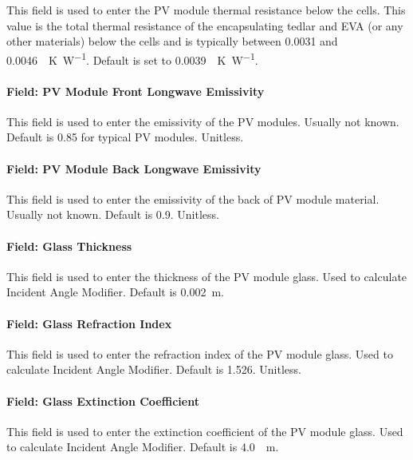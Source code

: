 This field is used to enter the PV module thermal resistance below the cells. This value is the total thermal resistance of the encapsulating tedlar and EVA (or any other materials) below the cells and is typically between 0.0031 and \SI{0.0046}{\area\K\per\watt}. Default is set to \SI{0.0039}{\area\K\per\watt}.

\paragraph{Field: PV Module Front Longwave Emissivity}\label{BIPVT-field-PVmodule-emissivity}

This field is used to enter the emissivity of the PV modules. Usually not known. Default is 0.85 for typical PV modules. Unitless.

\paragraph{Field: PV Module Back Longwave Emissivity}\label{BIPVT-field-moduleBack-emissivity}

This field is used to enter the emissivity of the back of PV module material. Usually not known. Default is 0.9. Unitless.

\paragraph{Field: Glass Thickness}\label{BIPVT-field-PVglass-thickness}

This field is used to enter the thickness of the PV module glass. Used to calculate Incident Angle Modifier. Default is \SI{0.002}{\m}.

\paragraph{Field: Glass Refraction Index}\label{BIPVT-field-PVglass-refraction}

This field is used to enter the refraction index of the PV module glass. Used to calculate Incident Angle Modifier. Default is 1.526. Unitless.

\paragraph{Field: Glass Extinction Coefficient}\label{BIPVT-field-PVglass-extinction}

This field is used to enter the extinction coefficient of the PV module glass. Used to calculate Incident Angle Modifier. Default is \SI{4.0}{\per\m}.


